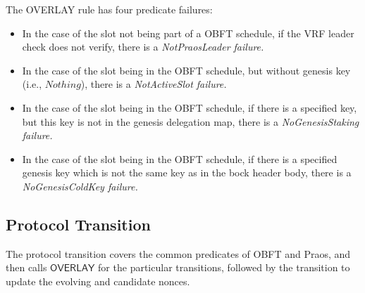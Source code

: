 The OVERLAY rule has four predicate failures:
\begin{itemize}
\item In the case of the slot not being part of a OBFT schedule, if the VRF
  leader check does not verify, there is a \em{NotPraosLeader} failure.
\item In the case of the slot being in the OBFT schedule, but without genesis
  key (i.e., $Nothing$), there is a \em{NotActiveSlot} failure.
\item In the case of the slot being in the OBFT schedule, if there is a
  specified key, but this key is not in the genesis delegation map, there is a
  \em{NoGenesisStaking} failure.
\item In the case of the slot being in the OBFT schedule, if there is a
  specified genesis key which is not the same key as in the bock header body,
  there is a \em{NoGenesisColdKey} failure.
\end{itemize}

\clearpage

\subsection{Protocol Transition}
\label{sec:protocol-trans}

The protocol transition covers the common predicates of OBFT and Praos,
and then calls $\mathsf{OVERLAY}$ for the particular transitions,
followed by the transition to update the evolving and candidate nonces.

